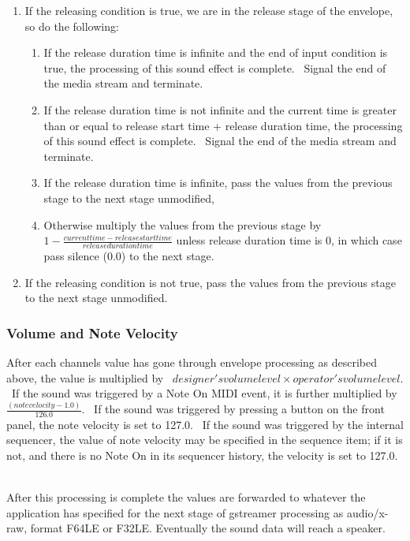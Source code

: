 \documentclass[letterpaper]{article}
\newcommand\liststyleLxii{%
\renewcommand\theenumi{\arabic{enumi}}
\renewcommand\theenumii{\alph{enumii}}
\renewcommand\labelenumi{ \theenumi.}
\renewcommand\labelenumii{ \theenumii)}
\renewcommand\labelitemi{•}
\renewcommand\labelitemii{•}
}
\begin{document}
\liststyleLxii
\begin{enumerate}
\item If the releasing condition is true, we are in the release stage of
the envelope, so do the following:

\begin{enumerate}
\item If the release duration time is infinite and the end of input
condition is true, the processing of this sound effect is complete.
\ Signal the end of the media stream and terminate.
\item If the release duration time is not infinite and the current time
is greater than or equal to release start time + release duration time,
the processing of this sound effect is complete. \ Signal the end of
the media stream and terminate.
\item If the release duration time is infinite, pass the values from the
previous stage to the next stage unmodified,
\item Otherwise multiply the values from the previous stage by
$1-\frac{\mathit{current}\mathit{time}-\mathit{release}\mathit{start}\mathit{time}}{\mathit{release}\mathit{duration}\mathit{time}}$
unless release duration time is 0, in which case pass silence (0.0) to
the next stage.
\end{enumerate}
\item If the releasing condition is not true, pass the values from the
previous stage to the next stage unmodified.
\end{enumerate}
\subsubsection[Volume and Note Velocity]{Volume and Note Velocity}
After each channel{\textquotesingle}s value has gone through envelope
processing as described above, the value is multiplied by \ 
$\mathit{designer}'s\mathit{volume}\mathit{level}\times
{\mathit{operator}'s\mathit{volume}\mathit{level}}$. \ If the sound was
triggered by a Note On MIDI event, it is further multiplied by 
$\frac{(\mathit{note}\mathit{velocity}-1.0)}{126.0}$. \ If the sound
was triggered by pressing a button on the front panel, the note
velocity is set to 127.0. \ If the sound was triggered by the internal
sequencer, the value of note velocity may be specified in the sequence
item; if it is not, and there is no Note On in its sequencer history,
the velocity is set to 127.0. \ 

After this processing is complete the values are forwarded to whatever
the application has specified for the next stage of gstreamer
processing as audio/x-raw, format F64LE or F32LE. Eventually the sound
data will reach a speaker.
\end{document}
